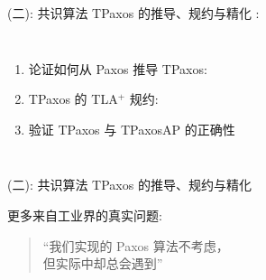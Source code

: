 \begin{frame}{(二): 共识算法 TPaxos 的推导、规约与精化}
  :

  \begin{columns}
      \begin{enumerate}
	\setlength{\itemsep}{12pt}
	\item 论证如何从 Paxos 推导 TPaxos: \\
	\item TPaxos 的 TLA$^+$ 规约: \\
	\item 验证 TPaxos 与 TPaxosAP 的正确性 \\
      \end{enumerate}
  \end{columns}
\end{frame}

\begin{frame}{(二): 共识算法 TPaxos 的推导、规约与精化}

  \begin{center}
    更多来自工业界的真实问题: \\[5pt]
    \begin{quote}
      \centering
      ``我们实现的 Paxos 算法不考虑，\\ 但实际中却总会遇到''
    \end{quote}

    \vspace{0.50cm}
    {}
  \end{center}
\end{frame}
